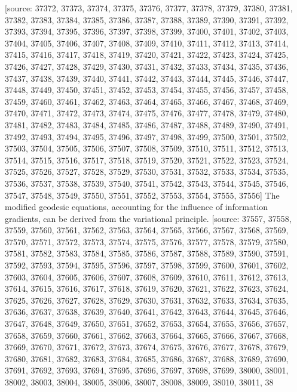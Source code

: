 \documentclass[12pt]{article}
\begin{document}
[source: 37372, 37373, 37374, 37375, 37376, 37377, 37378, 37379, 37380, 37381, 37382, 37383, 37384, 37385, 37386, 37387, 37388, 37389, 37390, 37391, 37392, 37393, 37394, 37395, 37396, 37397, 37398, 37399, 37400, 37401, 37402, 37403, 37404, 37405, 37406, 37407, 37408, 37409, 37410, 37411, 37412, 37413, 37414, 37415, 37416, 37417, 37418, 37419, 37420, 37421, 37422, 37423, 37424, 37425, 37426, 37427, 37428, 37429, 37430, 37431, 37432, 37433, 37434, 37435, 37436, 37437, 37438, 37439, 37440, 37441, 37442, 37443, 37444, 37445, 37446, 37447, 37448, 37449, 37450, 37451, 37452, 37453, 37454, 37455, 37456, 37457, 37458, 37459, 37460, 37461, 37462, 37463, 37464, 37465, 37466, 37467, 37468, 37469, 37470, 37471, 37472, 37473, 37474, 37475, 37476, 37477, 37478, 37479, 37480, 37481, 37482, 37483, 37484, 37485, 37486, 37487, 37488, 37489, 37490, 37491, 37492, 37493, 37494, 37495, 37496, 37497, 37498, 37499, 37500, 37501, 37502, 37503, 37504, 37505, 37506, 37507, 37508, 37509, 37510, 37511, 37512, 37513, 37514, 37515, 37516, 37517, 37518, 37519, 37520, 37521, 37522, 37523, 37524, 37525, 37526, 37527, 37528, 37529, 37530, 37531, 37532, 37533, 37534, 37535, 37536, 37537, 37538, 37539, 37540, 37541, 37542, 37543, 37544, 37545, 37546, 37547, 37548, 37549, 37550, 37551, 37552, 37553, 37554, 37555, 37556] The modified geodesic equations, accounting for the influence of information gradients, can be derived from the variational principle.
[source: 37557, 37558, 37559, 37560, 37561, 37562, 37563, 37564, 37565, 37566, 37567, 37568, 37569, 37570, 37571, 37572, 37573, 37574, 37575, 37576, 37577, 37578, 37579, 37580, 37581, 37582, 37583, 37584, 37585, 37586, 37587, 37588, 37589, 37590, 37591, 37592, 37593, 37594, 37595, 37596, 37597, 37598, 37599, 37600, 37601, 37602, 37603, 37604, 37605, 37606, 37607, 37608, 37609, 37610, 37611, 37612, 37613, 37614, 37615, 37616, 37617, 37618, 37619, 37620, 37621, 37622, 37623, 37624, 37625, 37626, 37627, 37628, 37629, 37630, 37631, 37632, 37633, 37634, 37635, 37636, 37637, 37638, 37639, 37640, 37641, 37642, 37643, 37644, 37645, 37646, 37647, 37648, 37649, 37650, 37651, 37652, 37653, 37654, 37655, 37656, 37657, 37658, 37659, 37660, 37661, 37662, 37663, 37664, 37665, 37666, 37667, 37668, 37669, 37670, 37671, 37672, 37673, 37674, 37675, 37676, 37677, 37678, 37679, 37680, 37681, 37682, 37683, 37684, 37685, 37686, 37687, 37688, 37689, 37690, 37691, 37692, 37693, 37694, 37695, 37696, 37697, 37698, 37699, 38000, 38001, 38002, 38003, 38004, 38005, 38006, 38007, 38008, 38009, 38010, 38011, 38
\end{document}
